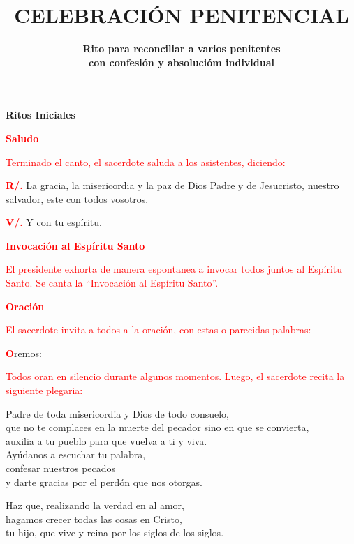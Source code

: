 \documentclass[12pt, letterpaper]{report}
\title{
	\Huge {\bfseries CELEBRACI\'ON PENITENCIAL}
}
\author{
	\large {\bfseries Rito para reconciliar a varios penitentes}\\ 
	\large {\bfseries con confesi\'on y absoluci\'om individual}
}
\date{ }
\begin{document}
\maketitle

\begin{center}
\Huge {\bfseries Ritos Iniciales}
\end{center}

\Large {\bfseries \textcolor{red}{Saludo}}

\large {\textcolor{red}{ Terminado el canto, el sacerdote saluda a los asistentes, diciendo:}}

\noindent
\Large {\bfseries \textcolor{red}{R/.}} \hspace{0.5cm} {La gracia, la misericordia y la paz de Dios Padre y de Jesucristo, nuestro salvador, este con todos vosotros.}

\noindent
\Large{{\bfseries \textcolor{red}{V/.}} \hspace{0.5cm} Y con tu esp\'iritu.}

\Large {\bfseries \textcolor{red}{Invocaci\'on al Esp\'iritu Santo}}

\large {\textcolor{red}{El presidente exhorta de manera espontanea a invocar todos juntos al Esp\'iritu Santo. Se canta la ``Invocaci\'on al Esp\'iritu Santo''.}}

\Large {\bfseries \textcolor{red}{Oraci\'on}}

\large {\textcolor{red}{El sacerdote invita a todos a la oraci\'on, con estas o parecidas palabras:}}

\lettrine[lines=1]{\bfseries \textcolor{red}{O}}{}\Large {remos:}

\large {\textcolor{red}{Todos oran en silencio durante algunos momentos. Luego, el sacerdote recita la siguiente plegaria:}}

\noindent
\Large {Padre de toda misericordia y Dios de todo consuelo, \\
que no te complaces en la muerte del pecador sino en que se convierta,\\
auxilia a tu pueblo para que vuelva a ti y viva.\\
Ay\'udanos a escuchar tu palabra,\\
confesar nuestros pecados\\
y darte gracias por el perd\'on que nos otorgas.}

\newpage

\noindent
\Large {Haz que, realizando la verdad en al amor,\\
hagamos crecer todas las cosas en Cristo,\\
tu hijo, que vive y reina por los siglos de los siglos.}
\end{document}
